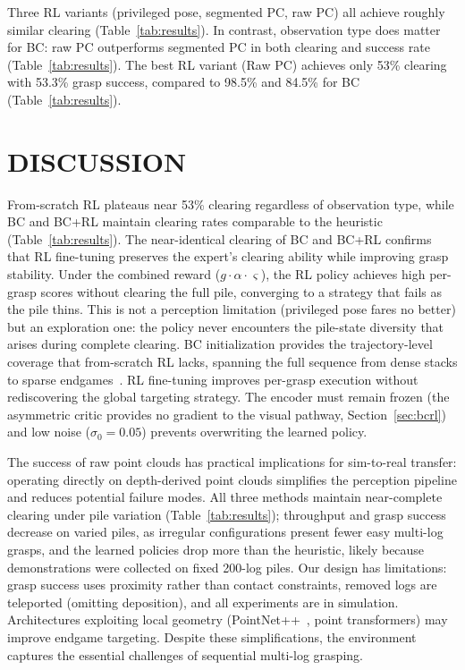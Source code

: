 \documentclass[letterpaper, 10 pt, conference]{ieeeconf}
\begin{document}
Three RL variants (privileged pose, segmented PC, raw PC) all achieve roughly similar clearing (Table~\ref{tab:results}).
In contrast, observation type does matter for BC: raw PC outperforms segmented PC in both clearing and success rate (Table~\ref{tab:results}).
The best RL variant (Raw PC) achieves only 53\% clearing with 53.3\% grasp success, compared to 98.5\% and 84.5\% for BC (Table~\ref{tab:results}).

\section{DISCUSSION}
From-scratch RL plateaus near 53\% clearing regardless of observation type, while BC and BC+RL maintain clearing rates comparable to the heuristic (Table~\ref{tab:results}). The near-identical clearing of BC and BC+RL confirms that RL fine-tuning preserves the expert's clearing ability while improving grasp stability.
Under the combined reward ($g \cdot \alpha \cdot \varsigma$), the RL policy achieves high per-grasp scores without clearing the full pile, converging to a strategy that fails as the pile thins. This is not a perception limitation (privileged pose fares no better) but an exploration one: the policy never encounters the pile-state diversity that arises during complete clearing.
BC initialization provides the trajectory-level coverage that from-scratch RL lacks, spanning the full sequence from dense stacks to sparse endgames~\cite{rajeswaran2018learning}. RL fine-tuning improves per-grasp execution without rediscovering the global targeting strategy. The encoder must remain frozen (the asymmetric critic provides no gradient to the visual pathway, Section~\ref{sec:bcrl}) and low noise ($\sigma_0 = 0.05$) prevents overwriting the learned policy.

The success of raw point clouds has practical implications for sim-to-real transfer: operating directly on depth-derived point clouds simplifies the perception pipeline and reduces potential failure modes.
All three methods maintain near-complete clearing under pile variation (Table~\ref{tab:results}); throughput and grasp success decrease on varied piles, as irregular configurations present fewer easy multi-log grasps, and the learned policies drop more than the heuristic, likely because demonstrations were collected on fixed 200-log piles.
Our design has limitations: grasp success uses proximity rather than contact constraints, removed logs are teleported (omitting deposition), and all experiments are in simulation. Architectures exploiting local geometry (PointNet++~\cite{qi2017pointnetplusplus}, point transformers) may improve endgame targeting. Despite these simplifications, the environment captures the essential challenges of sequential multi-log grasping.
\end{document}
